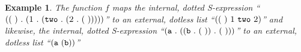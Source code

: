 \documentclass[11pt]{article} %
\newcommand{\scmsym}[1]{{\tt{#1}}}
\newcommand{\scmnum}[1]{{\textsc{#1}}}
\newtheorem{example}[theorem]{Example}
\newcommand{\sexpr}{\ensuremath{\textit{S-expression}}\xspace}
\newcommand{\symatom}{\ensuremath{\mathit{SYMBOL}}\xspace}
\newcommand{\numatom}{\ensuremath{\mathit{NUMBER}}\xspace}
\newcommand{\nilatom}{\ensuremath{\mathbf{(~)}}\xspace}
\newcommand{\ra}{\ensuremath{\rightarrow}\xspace}
\begin{document}

\begin{example}
The function $f$ maps the internal, dotted S-expression
``$(\nilatom~.~(\scmnum{1}~.~(\scmsym{two}~.~(\scmnum{2}~.~\nilatom))))$''
to an external, dotless list
``$(\nilatom~\scmnum{1}~\scmsym{two}~\scmnum{2})$''
and likewise, the internal, dotted S-expression
``$(\scmsym{a}~.~((\scmsym{b}~.~\nilatom)~.~\nilatom))$''
to an external, dotless list
``$(\scmsym{a}~(\scmsym{b}))$''
\end{example}
\end{document}
